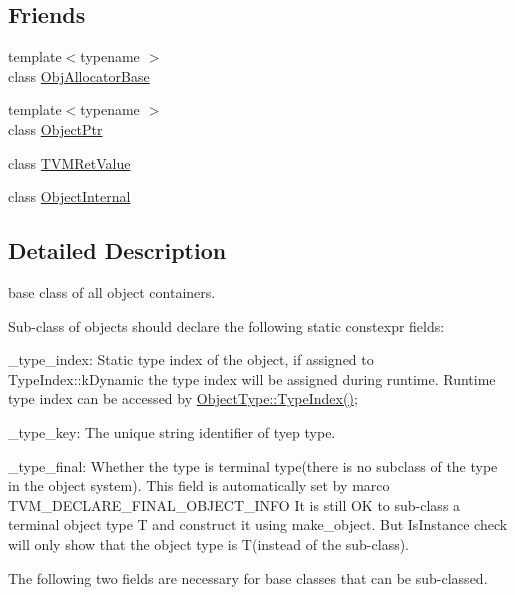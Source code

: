 \subsection*{Friends}
\begin{DoxyCompactItemize}
\item 
{\footnotesize template$<$typename $>$ }\\class \hyperlink{classtvm_1_1runtime_1_1Object_a8fae619f3bd1a2b2f7273d8d6525032a}{Obj\+Allocator\+Base}
\item 
{\footnotesize template$<$typename $>$ }\\class \hyperlink{classtvm_1_1runtime_1_1Object_a4193bb155125953e77ded93c0fb46965}{Object\+Ptr}
\item 
class \hyperlink{classtvm_1_1runtime_1_1Object_ae0ea8b4adc6dab8c74086bceaef6b3e1}{T\+V\+M\+Ret\+Value}
\item 
class \hyperlink{classtvm_1_1runtime_1_1Object_a4a8e2a2ce9dc9267dc18ac8abfd8dd16}{Object\+Internal}
\end{DoxyCompactItemize}


\subsection{Detailed Description}
base class of all object containers. 

Sub-\/class of objects should declare the following static constexpr fields\+:


\begin{DoxyItemize}
\item \+\_\+type\+\_\+index\+: Static type index of the object, if assigned to Type\+Index\+::k\+Dynamic the type index will be assigned during runtime. Runtime type index can be accessed by \hyperlink{namespacetvm_1_1runtime_a7d395cd724f727e86358b73b5cdeb4e4}{Object\+Type\+::\+Type\+Index()};
\item \+\_\+type\+\_\+key\+: The unique string identifier of tyep type.
\item \+\_\+type\+\_\+final\+: Whether the type is terminal type(there is no subclass of the type in the object system). This field is automatically set by marco T\+V\+M\+\_\+\+D\+E\+C\+L\+A\+R\+E\+\_\+\+F\+I\+N\+A\+L\+\_\+\+O\+B\+J\+E\+C\+T\+\_\+\+I\+N\+FO It is still OK to sub-\/class a terminal object type T and construct it using make\+\_\+object. But Is\+Instance check will only show that the object type is T(instead of the sub-\/class).
\end{DoxyItemize}

The following two fields are necessary for base classes that can be sub-\/classed.


